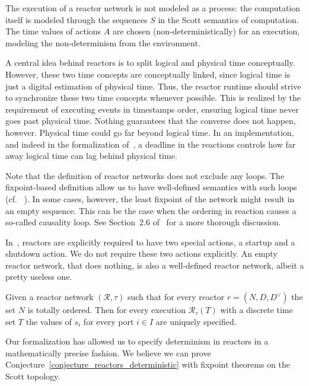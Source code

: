 The execution of a reactor network is not modeled as a process: the computation itself is modeled through the sequences $S$ in the Scott semantics of computation.
The time values of actions $A$ are chosen (non-deterministically) for an execution, modeling the non-determinism from the environment.

A central idea behind reactors is to split logical and physical time conceptually.
However, these two time concepts are conceptually linked, since logical time is just a digital estimation of physical time.
Thus, the reactor runtime should strive to synchronize these two time concepts whenever possible.
This is realized by the requirement of executing events in timestamps order, ensuring logical time never goes past physical time.
Nothing guarantees that the converse does not happen, however.
Physical time could go far beyond logical time.
In an implementation, and indeed in the formalization of~\cite{lohstroh_phdthesis}, a deadline in the reactions controls how far away logical time can lag behind physical time. 

Note that the definition of reactor networks does not exclude any loops.
The fixpoint-based definition allow us to have well-defined semantics with such loops (cf. ~\cite{kahn_74,lee_matsikoudis_semantics}).
In some cases, however, the least fixpoint of the network might result in an empty sequence.
This can be the case when the ordering in reaction causes a so-called causality loop.
See Section~2.6 of~\cite{lohstroh_phdthesis} for a more thorough discussion.

In~\cite{lohstroh_phdthesis}, reactors are explicitly required to have two special actions, a startup and a shutdown action.
We do not require these two actions explicitly.
An empty reactor network, that does nothing, is also a well-defined reactor network, albeit a pretty useless one.

\begin{conjecture}
    \label{conjecture_reactors_deterministic}
Given a reactor network $(\mathcal{R},\tau)$ such that for every reactor $r = (N,D,D^\vee)$ the set $N$ is totally ordered.
Then for every execution $\mathcal{R}_\tau(T)$ with a discrete time set $T$ the values of $s_i$ for every port $i \in I$ are uniquely specified.
\end{conjecture}

Our formalization has allowed us to specify determinism in reactors in a mathematically precise fashion.
We believe we can prove Conjecture~\ref{conjecture_reactors_deterministic} with fixpoint theorems on the Scott topology.

